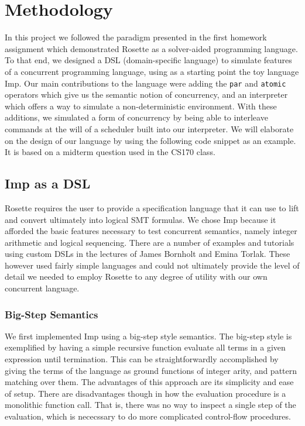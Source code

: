 \section{Methodology}

In this project we followed the paradigm presented in the first homework assignment which demonstrated Rosette as a solver-aided programming language.  To that end, we designed a DSL (domain-specific language) to simulate features of a concurrent programming language, using as a starting point the toy language Imp. Our main contributions to the language were adding the \texttt{par} and \texttt{atomic} operators which give us the semantic notion of concurrency, and an interpreter which offers a way to simulate a non-deterministic environment.  With these additions, we simulated a form of concurrency by being able to interleave commands at the will of a scheduler built into our interpreter.  We will elaborate on the design of our language by using the following code snippet as an example.  It is based on a midterm question used in the CS170 class.

\subsection{Imp as a DSL}
Rosette requires the user to provide a specification language that it can use to lift and convert ultimately into logical SMT formulas.  We chose Imp because it afforded the basic features necessary to test concurrent semantics, namely integer arithmetic and logical sequencing.  There are a number of examples and tutorials using custom DSLs  in the lectures of James Bornholt and Emina Torlak.  These however used fairly simple languages and could not ultimately provide the level of detail we needed to employ Rosette to any degree of utility with our own concurrent language.

\subsubsection{Big-Step Semantics}
We first implemented Imp using a big-step style semantics. The big-step style is exemplified by having a simple recursive function evaluate all terms in a given expression until termination.  This can be straightforwardly accomplished by giving the terms of the language as ground functions of integer arity, and pattern matching over them.  The advantages of this approach are its simplicity and ease of setup.  There are disadvantages though in how the evaluation procedure is a monolithic function call.  That is, there was no way to inspect a single step of the evaluation, which is nececssary to do more complicated control-flow procedures.

